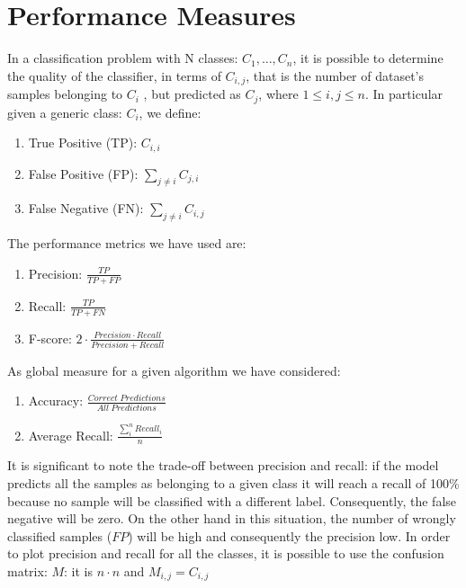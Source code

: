 \documentclass[LaM,binding=0.6cm]{sapthesis}
\begin{document}
\section{Performance Measures}
In a classification problem with N classes: ${C_1,\dots,C_n}$, it is possible to determine the quality of the classifier, in terms of $C_{i,j}$, that is the number of dataset's samples belonging to $C_i$ , but predicted as $C_j$, where $1 \leq i,j \leq n$. In particular given a generic class: $C_i$, we define:
\begin{enumerate}
\item True Positive (TP): $C_{i,i}$%
\item False Positive (FP): $\sum_{j\neq i}C_{j,i}$
\item False Negative (FN): $\sum_{j\neq i}C_{i,j}$
\end{enumerate}
The performance metrics we have used are:
\begin{enumerate}
\item Precision: $\frac{TP}{TP+FP}$
\item Recall: $\frac{TP}{TP+FN}$
\item F-score: $2\cdot \frac{Precision\cdot Recall}{Precision+Recall}$
\end{enumerate}
As global measure for a given algorithm we have considered:
\begin{enumerate}
\item Accuracy: $\frac{Correct \; Predictions}{All \; Predictions}$
\item Average Recall: $\frac{\sum_{i}^{n}Recall_i}{n}$
\end{enumerate}

It is significant to note the trade-off between precision and recall: if the model predicts all the samples as belonging to a given class it will reach a recall of 100\% because no sample will be classified with a different label. Consequently, the false negative will be zero. On the other hand in this situation, the number of wrongly classified samples ($FP$) will be high and consequently the precision low. In order to plot precision and recall for all the classes, it is possible to use the confusion matrix: $M$: it is $n\cdot n$ and $M_{i,j}=C_{i,j}$
\end{document}
